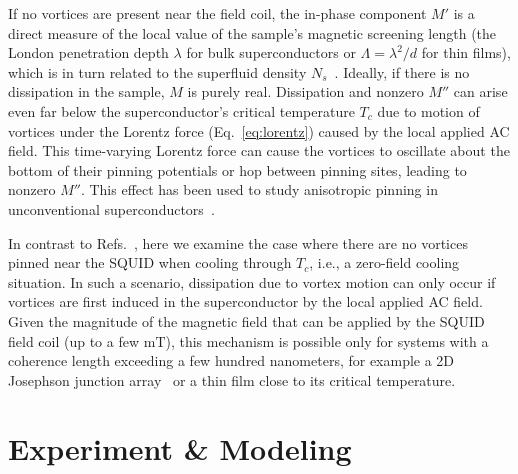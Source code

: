 \documentclass[%
 reprint,
 superscriptaddress,
 amsmath,
 amssymb,
 amsfonts,
 aps,
 prb,
]{revtex4-2}
\newcommand{\Tc}{T_c}
\newcommand{\mT}{\mathrm{mT}}
\begin{document}
If no vortices are present near the field coil, the in-phase component $M'$ is a direct measure of the local value of the sample's magnetic screening length (the London penetration depth $\lambda$ for bulk superconductors or $\Lambda=\lambda^2/d$ for thin films), which is in turn related to the superfluid density $N_s$~\cite{Kirtley2012-od}.
Ideally, if there is no dissipation in the sample, $M$ is purely real. Dissipation and nonzero $M''$ can arise even far below the superconductor's critical temperature $\Tc$ due to motion of vortices under the Lorentz force (Eq.~\ref{eq:lorentz}) caused by the local applied AC field.
This time-varying Lorentz force can cause the vortices to oscillate about the bottom of their pinning potentials or hop between pinning sites, leading to nonzero $M''$. This effect has been used to study anisotropic pinning in unconventional superconductors~\cite{Kalisky2011-ns, Zhang2019-hl, Bishop-Van_Horn2019-ng, Iguchi2021-wm}.

In contrast to Refs.~\cite{Kalisky2011-ns, Zhang2019-hl, Bishop-Van_Horn2019-ng, Iguchi2021-wm}, here we examine the case where there are no vortices pinned near the SQUID when cooling through $\Tc$, i.e., a zero-field cooling situation. In such a scenario, dissipation due to vortex motion can only occur if vortices are first induced in the superconductor by the local applied AC field. Given the magnitude of the magnetic field that can be applied by the SQUID field coil (up to a few $\mT$), this mechanism is possible only for systems with a coherence length  exceeding a few hundred nanometers, for example a 2D Josephson junction array~\cite{Bishop-Van_Horn2022-lr} or a thin film close to its critical temperature.

\section{Experiment \& Modeling}
\label{sec:experiment}
\end{document}
